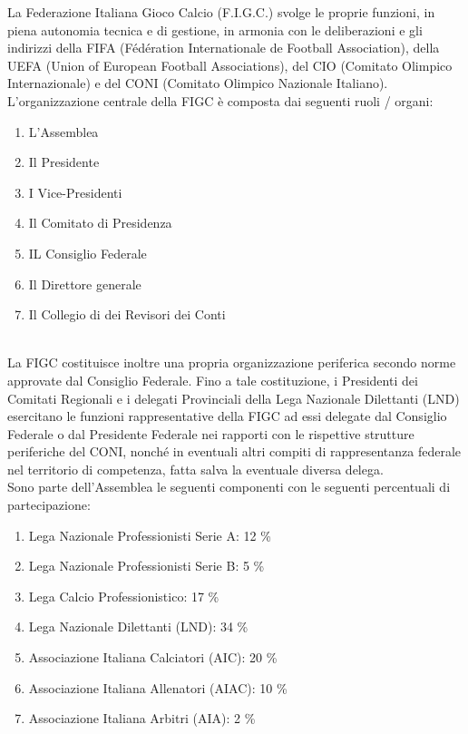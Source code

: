 \documentclass[../uefaC.tex]{subfiles}
\begin{document}
La Federazione Italiana Gioco Calcio (F.I.G.C.) svolge le proprie funzioni, in piena autonomia tecnica e di gestione, in armonia con le deliberazioni e gli indirizzi della FIFA (Fédération Internationale de Football Association), della UEFA (Union of European Football Associations), del CIO (Comitato Olimpico Internazionale) e del CONI (Comitato Olimpico Nazionale Italiano). \hfill \\
L'organizzazione centrale della FIGC è composta dai seguenti ruoli / organi:
\begin{enumerate}
    \item L'Assemblea
    \item Il Presidente
    \item I Vice-Presidenti
    \item Il Comitato di Presidenza
    \item IL Consiglio Federale
    \item Il Direttore generale
    \item Il Collegio di dei Revisori dei Conti
\end{enumerate}
\hfill \\
La FIGC costituisce inoltre una propria organizzazione periferica secondo norme approvate dal Consiglio Federale. Fino a tale costituzione, i Presidenti dei Comitati Regionali e i delegati Provinciali della Lega Nazionale Dilettanti (LND) esercitano le funzioni rappresentative della FIGC ad essi delegate dal Consiglio Federale o dal Presidente Federale nei rapporti con le rispettive strutture periferiche del CONI, nonché in eventuali altri compiti di rappresentanza federale nel territorio di competenza, fatta salva la eventuale diversa delega. \hfill \\
Sono parte dell'Assemblea le seguenti componenti con le seguenti percentuali di partecipazione:
\begin{enumerate}
    \item Lega Nazionale Professionisti Serie A: 12 \%
    \item Lega Nazionale Professionisti Serie B: 5 \%
    \item Lega Calcio Professionistico: 17 \%
    \item Lega Nazionale Dilettanti (LND): 34 \%
    \item Associazione Italiana Calciatori (AIC): 20 \%
    \item Associazione Italiana Allenatori (AIAC): 10 \%
    \item Associazione Italiana Arbitri (AIA): 2 \%
\end{enumerate}
\end{document}
